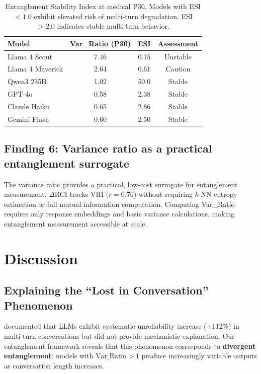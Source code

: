 \documentclass[11pt]{article}
\begin{document}
\begin{table}[h]
\centering
\begin{tabular}{lccc}
\toprule
\textbf{Model} & \textbf{Var\_Ratio (P30)} & \textbf{ESI} & \textbf{Assessment} \\
\midrule
Llama 4 Scout & 7.46 & 0.15 & Unstable \\
Llama 4 Maverick & 2.64 & 0.61 & Caution \\
Qwen3 235B & 1.02 & 50.0 & Stable \\
GPT-4o & 0.58 & 2.38 & Stable \\
Claude Haiku & 0.65 & 2.86 & Stable \\
Gemini Flash & 0.60 & 2.50 & Stable \\
\bottomrule
\end{tabular}
\caption{Entanglement Stability Index at medical P30. Models with ESI $< 1.0$ exhibit elevated risk of multi-turn degradation. ESI $> 2.0$ indicates stable multi-turn behavior.}
\end{table}

\subsection{Finding 6: Variance ratio as a practical entanglement surrogate}

The variance ratio provides a practical, low-cost surrogate for entanglement measurement. $\Delta$RCI tracks VRI ($r = 0.76$) without requiring $k$-NN entropy estimation or full mutual information computation. Computing Var\_Ratio requires only response embeddings and basic variance calculations, making entanglement measurement accessible at scale.

\section{Discussion}

\subsection{Explaining the ``Lost in Conversation'' Phenomenon}

\citet{laban2025lost} documented that LLMs exhibit systematic unreliability increase (+112\%) in multi-turn conversations but did not provide mechanistic explanation. Our entanglement framework reveals that this phenomenon corresponds to \textbf{divergent entanglement}: models with $\text{Var\_Ratio} > 1$ produce increasingly variable outputs as conversation length increases.
\end{document}
